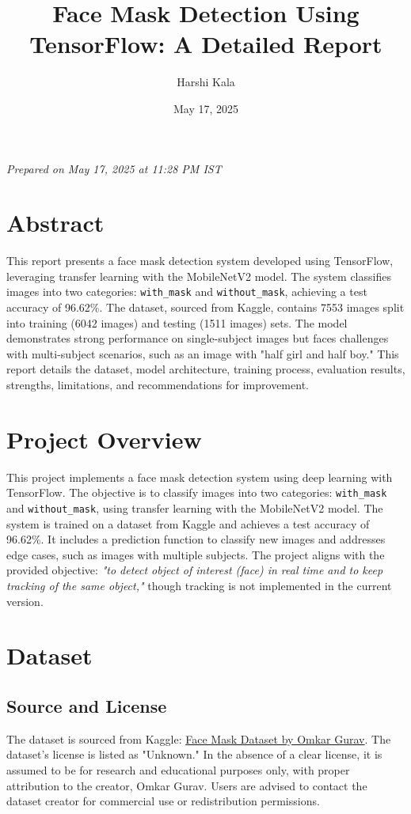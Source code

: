\documentclass[a4paper,12pt]{article}
\title{\textbf{Face Mask Detection Using TensorFlow: A Detailed Report}}
\author{Harshi Kala}
\date{May 17, 2025}
\begin{document}
\maketitle
\begin{center}
    \textit{Prepared on May 17, 2025 at 11:28 PM IST}
\end{center}

\section*{Abstract}
This report presents a face mask detection system developed using TensorFlow, leveraging transfer learning with the MobileNetV2 model. The system classifies images into two categories: \texttt{with\_mask} and \texttt{without\_mask}, achieving a test accuracy of 96.62\%. The dataset, sourced from Kaggle, contains 7553 images split into training (6042 images) and testing (1511 images) sets. The model demonstrates strong performance on single-subject images but faces challenges with multi-subject scenarios, such as an image with "half girl and half boy." This report details the dataset, model architecture, training process, evaluation results, strengths, limitations, and recommendations for improvement.

\tableofcontents
\newpage

\section{Project Overview}
This project implements a face mask detection system using deep learning with TensorFlow. The objective is to classify images into two categories: \texttt{with\_mask} and \texttt{without\_mask}, using transfer learning with the MobileNetV2 model. The system is trained on a dataset from Kaggle and achieves a test accuracy of 96.62\%. It includes a prediction function to classify new images and addresses edge cases, such as images with multiple subjects. The project aligns with the provided objective: \textit{"to detect object of interest (face) in real time and to keep tracking of the same object,"} though tracking is not implemented in the current version.

\section{Dataset}
\subsection{Source and License}
The dataset is sourced from Kaggle: \href{https://www.kaggle.com/datasets/omkargurav/face-mask-dataset}{Face Mask Dataset by Omkar Gurav}. The dataset's license is listed as "Unknown." In the absence of a clear license, it is assumed to be for research and educational purposes only, with proper attribution to the creator, Omkar Gurav. Users are advised to contact the dataset creator for commercial use or redistribution permissions.
\end{document}
